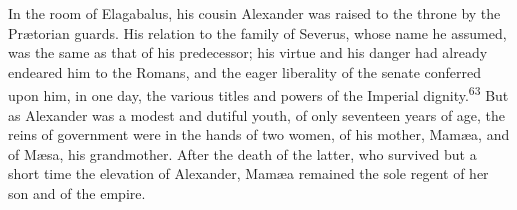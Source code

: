 In the room of Elagabalus, his cousin Alexander was raised to the
throne by the Prætorian guards. His relation to the family of
Severus, whose name he assumed, was the same as that of his
predecessor; his virtue and his danger had already endeared him
to the Romans, and the eager liberality of the senate conferred
upon him, in one day, the various titles and powers of the
Imperial dignity.\textsuperscript{63} But as Alexander was a modest and dutiful
youth, of only seventeen years of age, the reins of government
were in the hands of two women, of his mother, Mamæa, and of
Mæsa, his grandmother. After the death of the latter, who
survived but a short time the elevation of Alexander, Mamæa
remained the sole regent of her son and of the empire.


